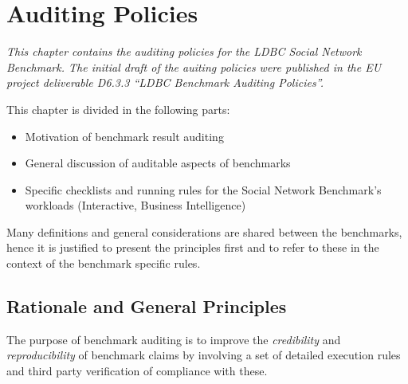 \chapter{Auditing Policies}
\label{sec:auditing}

\emph{This chapter contains the auditing policies for the LDBC Social Network Benchmark. The initial draft of the auiting policies were published in the EU project deliverable D6.3.3 ``LDBC Benchmark Auditing Policies''.}


This chapter is divided in the following parts:
\begin{itemize}
    \item Motivation of benchmark result auditing
    \item General discussion of auditable aspects of benchmarks
    \item Specific checklists and running rules for the Social Network Benchmark's workloads (Interactive, Business Intelligence)
\end{itemize}
Many definitions and general considerations are shared between the benchmarks, hence it is justified to present the principles first and to refer to these in the context of the benchmark specific rules.


\section{Rationale and General Principles}


The purpose of benchmark auditing is to improve the \emph{credibility} and \emph{reproducibility} of benchmark claims by involving a set of detailed execution rules and third party verification of compliance with these.

